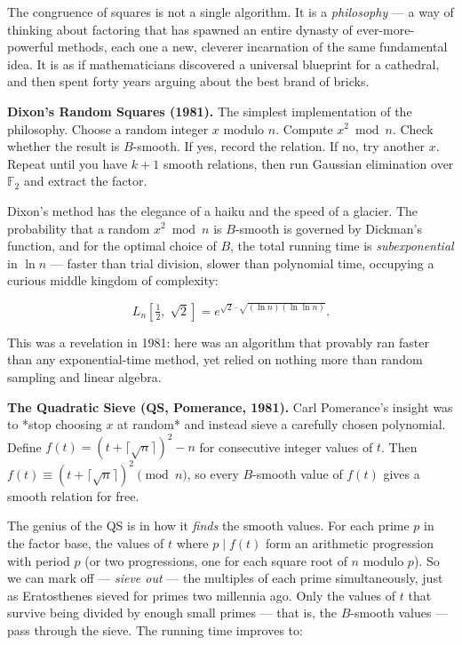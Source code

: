 \documentclass[12pt, letterpaper, openany]{book}
\theoremstyle{definition}
\theoremstyle{remark}
\begin{document}
The congruence of squares is not a single algorithm. It is a \textit{philosophy} --- a way of thinking about factoring that has spawned an entire dynasty of ever-more-powerful methods, each one a new, cleverer incarnation of the same fundamental idea. It is as if mathematicians discovered a universal blueprint for a cathedral, and then spent forty years arguing about the best brand of bricks.

\textbf{Dixon's Random Squares (1981).} The simplest implementation of the philosophy. Choose a random integer $x$ modulo $n$. Compute $x^2 \bmod n$. Check whether the result is $B$-smooth. If yes, record the relation. If no, try another $x$. Repeat until you have $k + 1$ smooth relations, then run Gaussian elimination over $\mathbb{F}_2$ and extract the factor.

Dixon's method has the elegance of a haiku and the speed of a glacier. The probability that a random $x^2 \bmod n$ is $B$-smooth is governed by Dickman's function, and for the optimal choice of $B$, the total running time is \textit{subexponential} in $\ln n$ --- faster than trial division, slower than polynomial time, occupying a curious middle kingdom of complexity:

\[
L_n\!\left[\tfrac{1}{2}, \; \sqrt{2}\right] = e^{\sqrt{2} \cdot \sqrt{(\ln n)(\ln \ln n)}}.
\]

This was a revelation in 1981: here was an algorithm that provably ran faster than any exponential-time method, yet relied on nothing more than random sampling and linear algebra.

\textbf{The Quadratic Sieve (QS, Pomerance, 1981).} Carl Pomerance's insight was to *stop choosing $x$ at random* and instead sieve a carefully chosen polynomial. Define $f(t) = (t + \lceil \sqrt{n} \rceil)^2 - n$ for consecutive integer values of $t$. Then $f(t) \equiv (t + \lceil \sqrt{n} \rceil)^2 \pmod{n}$, so every $B$-smooth value of $f(t)$ gives a smooth relation for free.

The genius of the QS is in how it \textit{finds} the smooth values. For each prime $p$ in the factor base, the values of $t$ where $p \mid f(t)$ form an arithmetic progression with period $p$ (or two progressions, one for each square root of $n$ modulo $p$). So we can mark off --- \textit{sieve out} --- the multiples of each prime simultaneously, just as Eratosthenes sieved for primes two millennia ago. Only the values of $t$ that survive being divided by enough small primes --- that is, the $B$-smooth values --- pass through the sieve. The running time improves to:
\end{document}
